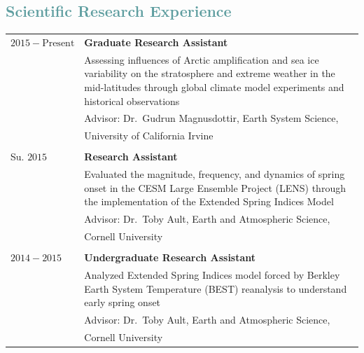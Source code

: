 \documentclass[margin,line,palatino,courier,10pt]{res}
\begin{document}
\begin{resume}
\section{\sc \textcolor{CadetBlue}{\large{Scientific Research Experience}}}
\vspace*{0.05in}
\begin{tabular}{@{}p{0.81in}p{4in}}
$2015 -\text{Present}$ & \textbf{Graduate Research Assistant}\\
& Assessing influences of Arctic amplification and sea ice variability on the stratosphere and extreme weather in the mid-latitudes through global climate model experiments and historical observations\\
& \hspace{0.2in} Advisor: Dr.\ Gudrun Magnusdottir, Earth System Science,\\
& \hspace{0.2in} University of California Irvine\\
\\
Su. $2015$ & \textbf{Research Assistant}\\
& Evaluated the magnitude, frequency, and dynamics of spring onset in the CESM Large Ensemble Project (LENS) through the implementation of the Extended Spring Indices Model \\
& \hspace{0.2in} Advisor: Dr.\ Toby Ault, Earth and Atmospheric Science,\\
& \hspace{0.2in} Cornell University\\
\\
$2014-2015$ & \textbf{Undergraduate Research Assistant}\\
& Analyzed Extended Spring Indices model forced by Berkley Earth System Temperature (BEST) reanalysis to understand early spring onset\\
& \hspace{0.2in} Advisor: Dr.\ Toby Ault, Earth and Atmospheric Science, \\
& \hspace{0.2in} Cornell University\\
\end{tabular}

\vspace{-0.1in}
\noindent\makebox[\linewidth][r]{\rule{\textwidth}{5pt}}
\vspace{-0.3in}


\end{resume}
\end{document}
